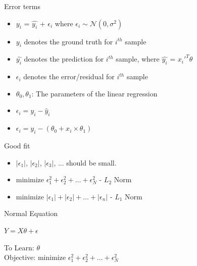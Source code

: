 \documentclass{beamer}
\begin{document}
\begin{frame}{Error terms}


	\begin{itemize}[<+->]
		\item $y_{i}$ = $\hat{y_{i}}$ + $\epsilon_{i}$ where $\epsilon_{i} \sim\mathcal{N}(0, \sigma^2)$
		\item $y_{i}$ denotes the ground truth for $i^{th}$ sample
		\item $\hat{y_{i}}$ denotes the prediction for $i^{th}$ sample, where $\hat{y_{i}}$ = $x_{i}'^{T} \theta$
		\item $\epsilon_{i}$ denotes the error/residual for $i^{th}$ sample
		\item $\theta_{0}, \theta_{1}$: The parameters of the linear regression
		\item   $  \epsilon_{i} = y_{i} - \hat{y}_{i}$
		\item     $\epsilon_{i} = y_{i} - (\theta_{0} + x_{i}\times\theta_{1})$

\end{itemize}





\end{frame}



\begin{frame}{Good fit}

\begin{itemize}
    \item<+-> $|\epsilon_{1}|$, $|\epsilon_{2}|$, $|\epsilon_{3}|$, ... should be small.
    \item<+-> 
${\text{minimize }} \epsilon_{1}^2 + \epsilon_{2}^2 + \dots + \epsilon_{N}^2$ - $L_{2}$ Norm
    \item<+-> 
${\text{minimize }} |\epsilon_{1}| + |\epsilon_{2}| + \dots + |\epsilon_{n}|$ - $L_{1}$ Norm
\end{itemize}
\end{frame}





\begin{frame}{Normal Equation}
    
    
   \pause  \begin{tcolorbox}
       $ Y = X\theta + \epsilon$
    \end{tcolorbox}
    
    \pause To Learn: $\theta$ \\
    \pause Objective: ${\text{minimize }} \epsilon_{1}^2 + \epsilon_{2}^2 + \dots + \epsilon_{N}^2$  
\end{frame}
\end{document}
